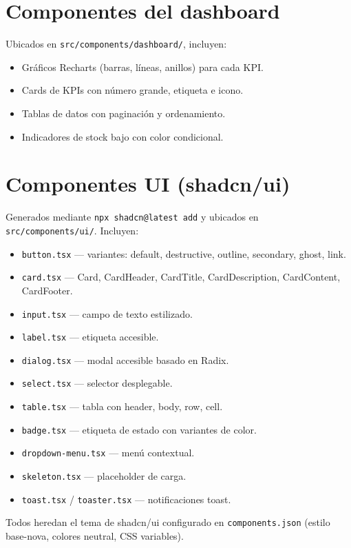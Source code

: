 \documentclass[12pt,a4paper,oneside]{report}
\newcommand{\file}[1]{\texttt{\color{cecyteDark}#1}}
\begin{document}
\section{Componentes del dashboard}

Ubicados en \file{src/components/dashboard/}, incluyen:

\begin{itemize}
  \item Gráficos Recharts (barras, líneas, anillos) para cada KPI.
  \item Cards de KPIs con número grande, etiqueta e icono.
  \item Tablas de datos con paginación y ordenamiento.
  \item Indicadores de stock bajo con color condicional.
\end{itemize}

\section{Componentes UI (shadcn/ui)}

Generados mediante \file{npx shadcn@latest add} y ubicados en \file{src/components/ui/}. Incluyen:

\begin{itemize}
  \item \file{button.tsx} — variantes: default, destructive, outline, secondary, ghost, link.
  \item \file{card.tsx} — Card, CardHeader, CardTitle, CardDescription, CardContent, CardFooter.
  \item \file{input.tsx} — campo de texto estilizado.
  \item \file{label.tsx} — etiqueta accesible.
  \item \file{dialog.tsx} — modal accesible basado en Radix.
  \item \file{select.tsx} — selector desplegable.
  \item \file{table.tsx} — tabla con header, body, row, cell.
  \item \file{badge.tsx} — etiqueta de estado con variantes de color.
  \item \file{dropdown-menu.tsx} — menú contextual.
  \item \file{skeleton.tsx} — placeholder de carga.
  \item \file{toast.tsx} / \file{toaster.tsx} — notificaciones toast.
\end{itemize}

Todos heredan el tema de shadcn/ui configurado en \file{components.json} (estilo base-nova, colores neutral, CSS variables).
\end{document}
